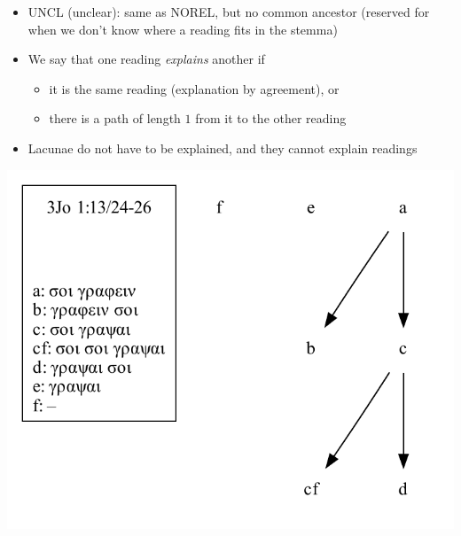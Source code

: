 \documentclass[10pt]{beamer}
\begin{document}
	\begin{frame}
		\begin{itemize}
			\item UNCL (unclear): same as NOREL, but no common ancestor (reserved for when we don't know where a reading fits in the stemma)
			\item We say that one reading \emph{explains} another if
			\begin{itemize}
				\item it is the same reading (explanation by agreement), or
				\item there is a path of length $1$ from it to the other reading
			\end{itemize}
			\item Lacunae do not have to be explained, and they cannot explain readings
		\end{itemize}
		\begin{center}
			\includegraphics[scale=0.5]{../img/B25K1V13U24-26-local-stemma-incomplete.pdf}
		\end{center}
	\end{frame}
\end{document}
